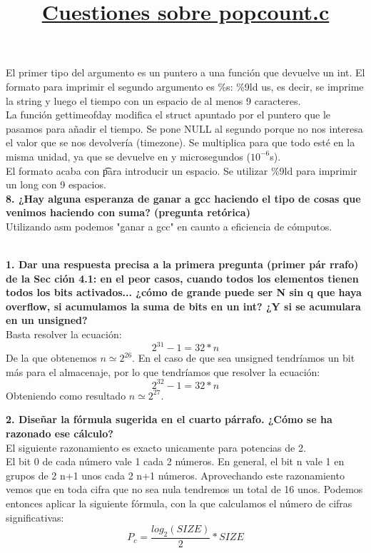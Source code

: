 \documentclass[11pt,a4paper]{article}
\begin{document}
El primer tipo del argumento es un puntero a una función que devuelve un int. El formato para imprimir el segundo argumento es \%s: \%9ld us, es decir, se imprime la string y luego el tiempo con un espacio de al menos 9 caracteres. \\
La función gettimeofday modifica el struct apuntado por el puntero que le pasamos para añadir el tiempo. Se pone NULL al segundo porque no nos interesa el valor que se nos devolvería (timezone). Se multiplica para que todo esté en la misma unidad, ya que se devuelve en y microsegundos ($10^{-6}$s). \\
El formato acaba con \t para introducir un espacio. Se utilizar \%9ld para imprimir un long con 9 espacios. \\

\textbf{8. ¿Hay  alguna  esperanza  de  ganar  a  gcc haciendo  el  tipo de cosas que venimos haciendo con suma? (pregunta retórica) } \\

Utilizando asm podemos "ganar a gcc" en caunto a eficiencia de cómputos. \\

\title{\large{\textbf{\underline{Cuestiones sobre popcount.c}}}} \\

\textbf{1. Dar una respuesta precisa a la primera pregunta (primer pár rrafo) de la Sec ción 4.1: en el peor casos, cuando todos los elementos tienen todos los bits activados... ¿cómo de grande puede ser N sin q que haya overflow, si acumulamos la suma de bits en un int? ¿Y si se acumulara en un unsigned?} \\

Basta resolver la ecuación:
\[2^{31}-1=32*n\]
De la que obtenemos $n \simeq 2^{26}$.
En el caso de que sea unsigned tendríamos un bit más para el almacenaje, por lo que tendríamos que resolver la ecuación:
\[2^{32}-1=32*n\]
Obteniendo como resultado $n \simeq 2^{27}$.

\textbf{2. Diseñar la fórmula sugerida en  el cuarto párrafo. ¿Cómo se ha razonado ese cálculo?} \\

El siguiente razonamiento es exacto unicamente para potencias de 2.\\
El bit 0 de cada número vale 1 cada 2 números. En general, el bit n vale 1 en grupos de 2 n+1 unos cada 2 n+1 números. Aprovechando este razonamiento vemos que en toda cifra que no sea nula tendremos un total de 16 unos. Podemos entonces aplicar la siguiente fórmula, con la que calculamos el número de cifras significativas:
\[P_c=\frac{log_2(SIZE)}{2}*SIZE\]
\end{document}
